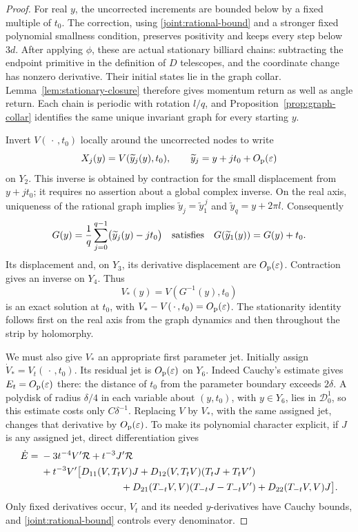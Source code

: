 \begin{proof}
For real \(y\), the uncorrected increments are bounded below by a fixed
multiple of \(t_0\).  The correction, using
\eqref{joint:rational-bound} and a stronger fixed polynomial smallness
condition, preserves positivity and keeps every step below \(3d\).
After applying \(\phi\), these are actual stationary billiard chains:
subtracting the endpoint primitive in the definition of \(D\) telescopes,
and the coordinate change has nonzero derivative.  Their initial
states lie in the graph collar.  Lemma~\ref{lem:stationary-closure}
therefore gives momentum return as well as angle return.  Each chain
is periodic with rotation \(l/q\), and
Proposition~\ref{prop:graph-collar} identifies the same unique invariant
graph for every starting \(y\).

Invert \(V(\,\cdot\,,t_0)\) locally around the uncorrected nodes to
write
\[
 X_j(y)=V(\widetilde y_j(y),t_0),\qquad
 \widetilde y_j=y+jt_0+O_{\mathrm p}(\varepsilon)
\]
on \(Y_2\).  This inverse is obtained by contraction for the small
displacement from \(y+jt_0\); it requires no assertion about a global
complex inverse.  On the real axis, uniqueness of the rational graph
implies
\(\widetilde y_j=\widetilde y_1^{\,j}\) and
\(\widetilde y_q=y+2\pi l\).  Consequently
\[
 G(y)=\frac1q\sum_{j=0}^{q-1}\bigl(\widetilde y_j(y)-jt_0\bigr)
 \quad\hbox{satisfies}\quad
 G(\widetilde y_1(y))=G(y)+t_0.
\]
Its displacement and, on \(Y_3\), its derivative displacement are
\(O_{\mathrm p}(\varepsilon)\).  Contraction gives an inverse on \(Y_4\).
Thus
\begin{equation}
 V_*(y)=V(G^{-1}(y),t_0)
 \label{joint:rational-solution}
\end{equation}
is an exact solution at \(t_0\), with
\(V_*-V(\,\cdot\,,t_0)=O_{\mathrm p}(\varepsilon)\).  The stationarity
identity follows first on the real axis from the graph dynamics and
then throughout the strip by holomorphy.

We must also give \(V_*\) an appropriate first parameter jet.  Initially
assign \(\dot V_*=V_t(\,\cdot\,,t_0)\).  Its residual jet is
\(O_{\mathrm p}(\varepsilon)\) on \(Y_6\).  Indeed Cauchy's estimate gives
\(E_t=O_{\mathrm p}(\varepsilon)\) there: the distance of \(t_0\) from the
parameter boundary exceeds \(2\delta\).  A polydisk of radius
\(\delta/4\) in each variable about \((y,t_0)\), with \(y\in Y_6\),
lies in \(\mathcal D_0^1\), so this estimate costs only \(C\delta^{-1}\).
Replacing \(V\) by \(V_*\), with the same assigned
jet, changes that derivative by \(O_{\mathrm p}(\varepsilon)\).
To make its polynomial character explicit, if \(J\) is any assigned
jet, direct differentiation gives
\begin{align}
 \dot E={}&-3t^{-4}V'\mathcal R+t^{-3}J'\mathcal R\notag\\
 &+t^{-3}V'\bigl[
 D_{11}(V,T_tV)J+D_{12}(V,T_tV)(T_tJ+T_tV')\notag\\
 &\hspace{29mm}
 +D_{21}(T_{-t}V,V)(T_{-t}J-T_{-t}V')
 +D_{22}(T_{-t}V,V)J\bigr].
 \label{joint:raw-jet}
\end{align}
Only fixed derivatives occur, \(V_t\) and its needed \(y\)-derivatives
have Cauchy bounds, and \eqref{joint:rational-bound} controls every
denominator.


\end{proof}
